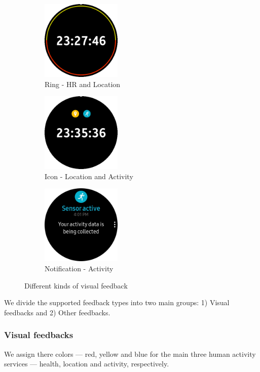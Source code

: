 \documentclass[conference, a4paper, 10pt, twocolumn]{IEEEtran}
\begin{document}
\begin{figure}[t!]
    \centering
    \begin{subfigure}[t]{0.33\textwidth}
        \centering
        \includegraphics[height=1.5in]{img/ringHR&Location.png}
        \caption{Ring - HR and Location}
        \label{fig:ringFeedback}
    \end{subfigure}%
    \begin{subfigure}[t]{0.33\textwidth}
        \centering
        \includegraphics[height=1.5in]{img/iconLocation&Activity.png}
        \caption{Icon - Location and Activity}
        \label{fig:iconFeedback}
    \end{subfigure}
    \begin{subfigure}[t]{0.33\textwidth}
        \centering
        \includegraphics[height=1.5in]{img/notificationActifity.png}
        \caption{Notification - Activity}
        \label{fig:notificationFeedback}
    \end{subfigure}
    \caption{Different kinds of visual feedback}
    \label{fig:visualFeedbackImage}
\end{figure}

We divide the supported feedback types into two main groups: 1) Visual feedbacks and 2) Other feedbacks.

\subsubsection{Visual feedbacks}
We assign there colors --- red, yellow and blue for the main three human activity services --- health, location and activity, respectively.
\end{document}
